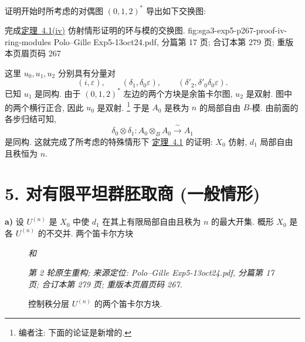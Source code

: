 
证明开始时所考虑的对偶图
\hyperref[fig:sga3-exp5-dual-012star]{\((0,1,2)^\ast\)} 导出如下交换图:

  {完成\hyperref[thm:sga3-V-4.1-iv]{定理~4.1(iv)} 仿射情形证明的环与模的交换图.}
  {fig:sga3-exp5-p267-proof-iv-ring-modules}
  {Polo--Gille Exp5-13oct24.pdf, 分篇第 17 页;
  合订本第 279 页; 重版本页眉页码 267}

这里 \(u_0,u_1,u_2\) 分别具有分量对
\[
  (i,\varepsilon),\qquad
  (\delta_1,\delta_0\varepsilon),\qquad
  (\delta'_2,\delta'_0\delta_0\varepsilon).
\]
已知 \(u_1\) 是同构. 由于 \((0,1,2)^\ast\) 左边的两个方块是余笛卡尔图,
\(u_2\) 是双射. 图中的两个横行正合, 因此 \(u_0\) 是双射.%
\footnote{\label{note:sga3-V-26}编者注: 下面的论证是新增的.}
于是 \(A_0\) 是秩为 \(n\) 的局部自由 \(B\)-模.
由前面的各步归结可知,
\[
  \delta_0\otimes\delta_1:
  A_0\otimes_BA_0\xrightarrow{\ \sim\ }A_1
\]
是同构. 这就完成了所考虑的特殊情形下
\hyperref[thm:sga3-V-4.1]{定理~4.1} 的证明:
\(X_0\) 仿射, \(d_1\) 局部自由且秩恒为 \(n\).

\section*{5. 对有限平坦群胚取商 (一般情形)}
\label{sec:sga3-V-5}

\label{par:sga3-V-5-a}%
\noindent\textbf{a)}
设 \(U^{(n)}\) 是 \(X_0\) 中使 \(d_1\) 在其上有限局部自由且秩为 \(n\)
的最大开集. 概形 \(X_0\) 是各 \(U^{(n)}\) 的不交并. 两个笛卡尔方块

\begin{figure}[H]
  \centering
  \qquad\textit{和}\qquad
  \caption{控制秩分层 \(U^{(n)}\) 的两个笛卡尔方块.}
  \label{fig:sga3-exp5-p267-section5-rank-squares}
  \par\smallskip
  {\footnotesize\itshape 第 2 轮原生重构; 来源定位:
  Polo--Gille Exp5-13oct24.pdf, 分篇第 17 页;
  合订本第 279 页; 重版本页眉页码 267.}
\end{figure}

